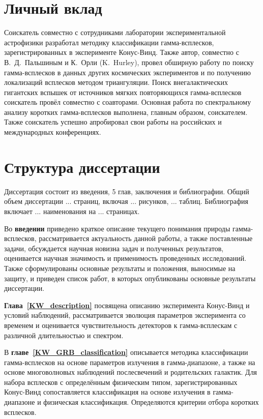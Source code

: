 \section*{Личный вклад}
Соискатель совместно с сотрудниками лаборатории экспериментальной астрофизики 
разработал методику классификации гамма-всплесков, зарегистрированных в эксперименте 
Конус-Винд. Также автор, совместно с В.~Д.~Пальшиным и К.~Орли (K.~Hurley), 
провел обширную работу по поиску гамма-всплесков в данных других космических 
экспериментов и по получению локализаций всплесков методом триангуляции.
Поиск внегалактических гигантских вспышек от источников мягких повторяющихся
гамма-всплесков соискатель провёл совместно с соавторами. 
Основная работа по спектральному анализу коротких гамма-всплесков выполнена, главным образом, соискателем.
Также соискатель успешно апробировал свои работы на российских и международных конференциях.

\section*{Структура диссертации}
Диссертация состоит из введения, 5 глав, заключения и библиографии.
Общий объем диссертации ... страниц, включая ... рисунков, ... таблиц. 
Библиография включает ... наименования на ... страницах.

Во \textbf{введении} приведено краткое описание текущего понимания природы гамма-всплесков,
рассматривается актуальность данной работы, а также поставленные задачи, 
обсуждается научная новизна задач и полученных результатов, 
оценивается научная значимость и применимость проведенных исследований.
Также сформулированы основные результаты и положения, выносимые на защиту, и приведен
список работ, в которых опубликованы основные результаты диссертации.

\textbf{Глава~\ref{KW_description}} посвящена описанию эксперимента Конус-Винд и условий
наблюдений, рассматривается эволюция параметров эксперимента со временем и 
оценивается чувствительность детекторов к гамма-всплескам с различной длительностью и спектром.

В \textbf{главе~\ref{KW_GRB_classification}} описывается методика классификации 
гамма-всплесков на основе параметров излучения в гамма-диапазоне, а также на основе 
многоволновых наблюдений послесвечений и родительских галактик. Для набора всплесков
с определённым физическим типом, зарегистрированных Конус-Винд сопоставляется 
классификация на основе излучения в гамма-диапазоне и физическая классификация.
Определяются критерии отбора коротких всплесков.


